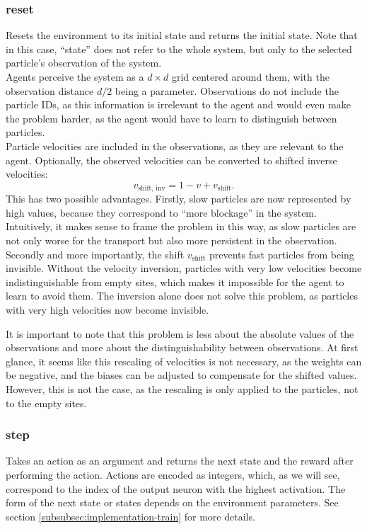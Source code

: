 \subsubsection{reset}
Resets the environment to its initial state and returns the initial state. Note that in this case, \enquote{state} does not refer to the whole system, but only to the selected particle's observation of the system. 
\\
Agents perceive the system as a $d\times d$ grid centered around them, with the observation distance $d/2$ being a parameter. Observations do not include the particle IDs, as this information is irrelevant to the agent and would even make the problem harder, as the agent would have to learn to distinguish between particles. 
\\
Particle velocities are included in the observations, as they are relevant to the agent. Optionally, the observed velocities can be converted to shifted inverse velocities:
\begin{equation}
    v_{\text{shift, inv}} = 1 - v + v_{\text{shift}} \text{.}
    \label{eq:inverse-velocities}
\end{equation}
This has two possible advantages. Firstly, slow particles are now represented by high values, because they correspond to \enquote{more blockage} in the system. Intuitively, it makes sense to frame the problem in this way, as slow particles are not only worse for the transport but also more persistent in the observation. Secondly and more importantly, the shift $v_{\text{shift}}$ prevents fast particles from being invisible. Without the velocity inversion, particles with very low velocities become indistinguishable from empty sites, which makes it impossible for the agent to learn to avoid them. The inversion alone does not solve this problem, as particles with very high velocities now become invisible. 


It is important to note that this problem is less about the absolute values of the observations and more about the distinguishability between observations. At first glance, it seems like this rescaling of velocities is not necessary, as the weights can be negative, and the biases can be adjusted to compensate for the shifted values. However, this is not the case, as the rescaling is only applied to the particles, not to the empty sites. 


\subsubsection{step}
\label{subsubsec:implementation-step}
Takes an action as an argument and returns the next state and the reward after performing the action. Actions are encoded as integers, which, as we will see, correspond to the index of the output neuron with the highest activation. The form of the next state or states depends on the environment parameters. See section \ref{subsubsec:implementation-train} for more details.


